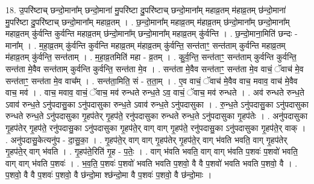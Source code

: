 \documentclass[17pt]{extarticle}
\begin{document}
18. उ॒परि॑ष्टाच् छन्दो॒माना᳚म् छन्दो॒माना॑ मु॒परि॑ष्टा दु॒परि॑ष्टाच् छन्दो॒माना᳚म् महाव्र॒तम् म॑हाव्र॒तम् छ॑न्दो॒माना॑ मु॒परि॑ष्टा दु॒परि॑ष्टाच् छन्दो॒माना᳚म् महाव्र॒तम् । . छ॒न्दो॒माना᳚म् महाव्र॒तम् म॑हाव्र॒तम् छ॑न्दो॒माना᳚म् छन्दो॒माना᳚म् महाव्र॒तम् कु॑र्वन्ति कुर्वन्ति महाव्र॒तम् छ॑न्दो॒माना᳚म् छन्दो॒माना᳚म् महाव्र॒तम् कु॑र्वन्ति । . छ॒न्दो॒माना॒मिति॑ छन्दः - माना᳚म् । . म॒हा॒व्र॒तम् कु॑र्वन्ति कुर्वन्ति महाव्र॒तम् म॑हाव्र॒तम् कु॑र्वन्ति॒ सन्त॑ताꣳ॒॒ सन्त॑ताम् कुर्वन्ति महाव्र॒तम् म॑हाव्र॒तम् कु॑र्वन्ति॒ सन्त॑ताम् । . म॒हा॒व्र॒तमिति॑ महा - व्र॒तम् । . कु॒र्व॒न्ति॒ सन्त॑ताꣳ॒॒ सन्त॑ताम् कुर्वन्ति कुर्वन्ति॒ सन्त॑ता मे॒वैव सन्त॑ताम् कुर्वन्ति कुर्वन्ति॒ सन्त॑ता मे॒व । . सन्त॑ता मे॒वैव सन्त॑ताꣳ॒॒ सन्त॑ता मे॒व वाचं॒ ॅवाच॑ मे॒व सन्त॑ताꣳ॒॒ सन्त॑ता मे॒व वाच᳚म् । . सन्त॑ता॒मिति॒ सं - त॒ता॒म् । . ए॒व वाचं॒ ॅवाच॑ मे॒वैव वाच॒ मवाव॒ वाच॑ मे॒वैव वाच॒ मव॑ । . वाच॒ मवाव॒ वाचं॒ ॅवाच॒ मव॑ रुन्धते रुन्ध॒ते ऽव॒ वाचं॒ ॅवाच॒ मव॑ रुन्धते । . अव॑ रुन्धते रुन्ध॒ते ऽवाव॑ रुन्ध॒ते ऽनु॑पदासु॒का ऽनु॑पदासुका रुन्ध॒ते ऽवाव॑ रुन्ध॒ते ऽनु॑पदासुका । . रु॒न्ध॒ते ऽनु॑पदासु॒का ऽनु॑पदासुका रुन्धते रुन्ध॒ते ऽनु॑पदासुका गृ॒हप॑तेर् गृ॒हप॑ते॒ रनु॑पदासुका रुन्धते रुन्ध॒ते ऽनु॑पदासुका गृ॒हप॑तेः । . अनु॑पदासुका गृ॒हप॑तेर् गृ॒हप॑ते॒ रनु॑पदासु॒का ऽनु॑पदासुका गृ॒हप॑ते॒र् वाग् वाग् गृ॒हप॑ते॒ रनु॑पदासु॒का ऽनु॑पदासुका गृ॒हप॑ते॒र् वाक् । . अनु॑पदासु॒केत्यनु॑प - दा॒सु॒का॒ । . गृ॒हप॑ते॒र् वाग् वाग् गृ॒हप॑तेर् गृ॒हप॑ते॒र् वाग् भ॑वति भवति॒ वाग् गृ॒हप॑तेर् गृ॒हप॑ते॒र् वाग् भ॑वति । . गृ॒हप॑ते॒रिति॑ गृ॒ह - प॒तेः॒ । . वाग् भ॑वति भवति॒ वाग् वाग् भ॑वति प॒शवः॑ प॒शवो॑ भवति॒ वाग् वाग् भ॑वति प॒शवः॑ । . भ॒व॒ति॒ प॒शवः॑ प॒शवो॑ भवति भवति प॒शवो॒ वै वै प॒शवो॑ भवति भवति प॒शवो॒ वै । . प॒शवो॒ वै वै प॒शवः॑ प॒शवो॒ वै छ॑न्दो॒मा श्छ॑न्दो॒मा वै प॒शवः॑ प॒शवो॒ वै छ॑न्दो॒माः । \newline
\end{document}
